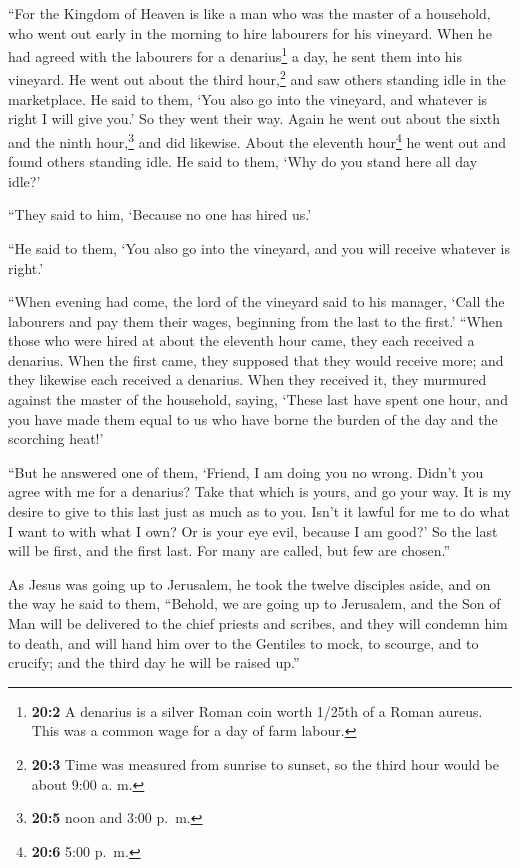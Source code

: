  ``For the Kingdom of Heaven is like a man who was the
master of a household, who went out early in the morning to hire
labourers for his vineyard.  When he had agreed with the
labourers for a denarius\footnote{\textbf{20:2} A denarius is a silver
  Roman coin worth 1/25th of a Roman aureus. This was a common wage for
  a day of farm labour.} a day, he sent them into his vineyard.
 He went out about the third hour,\footnote{\textbf{20:3}
  Time was measured from sunrise to sunset, so the third hour would be
  about 9:00 a. m.} and saw others standing idle in the marketplace.
 He said to them, `You also go into the vineyard, and
whatever is right I will give you.' So they went their way.
 Again he went out about the sixth and the ninth
hour,\footnote{\textbf{20:5} noon and 3:00 p.~m.} and did likewise.
 About the eleventh hour\footnote{\textbf{20:6} 5:00 p.~m.}
he went out and found others standing idle. He said to them, `Why do you
stand here all day idle?'

 ``They said to him, `Because no one has hired us.'

``He said to them, `You also go into the vineyard, and you will receive
whatever is right.'

 ``When evening had come, the lord of the vineyard said to
his manager, `Call the labourers and pay them their wages, beginning
from the last to the first.'  ``When those who were hired
at about the eleventh hour came, they each received a denarius.
 When the first came, they supposed that they would
receive more; and they likewise each received a denarius.
 When they received it, they murmured against the master
of the household,  saying, `These last have spent one
hour, and you have made them equal to us who have borne the burden of
the day and the scorching heat!'

 ``But he answered one of them, `Friend, I am doing you
no wrong. Didn't you agree with me for a denarius?  Take
that which is yours, and go your way. It is my desire to give to this
last just as much as to you.  Isn't it lawful for me to
do what I want to with what I own? Or is your eye evil, because I am
good?'  So the last will be first, and the first last.
For many are called, but few are chosen.''

 As Jesus was going up to Jerusalem, he took the twelve
disciples aside, and on the way he said to them, 
``Behold, we are going up to Jerusalem, and the Son of Man will be
delivered to the chief priests and scribes, and they will condemn him to
death,  and will hand him over to the Gentiles to mock,
to scourge, and to crucify; and the third day he will be raised up.''

